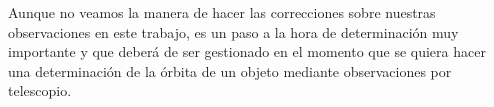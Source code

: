 \documentclass[11pt]{book}
\begin{document}
Aunque no veamos la manera de hacer las correcciones sobre nuestras observaciones en este trabajo, es un paso a la hora de determinación muy importante y que deberá de ser gestionado en el momento que se quiera hacer una determinación de la órbita de un objeto mediante observaciones por telescopio.\\

\end{document}
